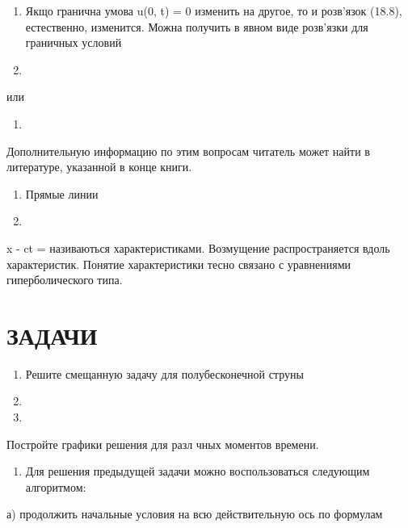 \documentclass[
  ukrainian,
]{article}
\providecommand{\tightlist}{%
  \setlength{\itemsep}{0pt}\setlength{\parskip}{0pt}}
\begin{document}
\begin{enumerate}
\def\labelenumi{\arabic{enumi}.}
\setcounter{enumi}{1}
\item
  Якщо гранична умова u(0, t) = 0 изменить на другое, то и розв'язок
  (18.8), естественно, изменится. Можна получить в явном виде розв'язки
  для граничных условий
\item
\end{enumerate}

или

\begin{enumerate}
\def\labelenumi{\arabic{enumi}.}
\setcounter{enumi}{14}
\tightlist
\item
\end{enumerate}

Дополнительную информацию по этим вопросам читатель может найти в
литературе, указанной в конце книги.

\begin{enumerate}
\def\labelenumi{\arabic{enumi}.}
\setcounter{enumi}{2}
\item
  Прямые линии
\item
\end{enumerate}

x - ct =  називаються характеристиками. Возмущение
распространяется вдоль характеристик. Понятие характеристики тесно
связано с уравнениями гиперболического типа.

\section{ЗАДАЧИ}\label{ux437ux430ux434ux430ux447ux438-2}

\begin{enumerate}
\def\labelenumi{\arabic{enumi}.}
\item
  Решите смещанную задачу для полубесконечной струны
\item
\item
\end{enumerate}

Постройте графики решения для разл чных моментов времени.

\begin{enumerate}
\def\labelenumi{\arabic{enumi}.}
\setcounter{enumi}{1}
\tightlist
\item
  Для решения предыдущей задачи можно воспользоваться следующим
  алгоритмом:
\end{enumerate}

а) продолжить начальные условия на всю действительную ось по формулам
\end{document}
